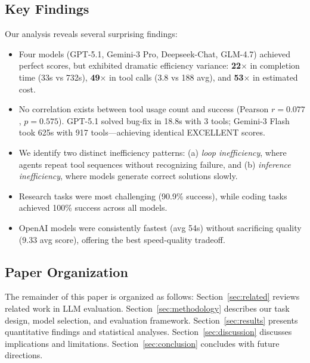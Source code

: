 \subsection{Key Findings}

Our analysis reveals several surprising findings:

\begin{itemize}
    \item Four models (GPT-5.1, Gemini-3 Pro, Deepseek-Chat, GLM-4.7) achieved perfect scores, but exhibited dramatic efficiency variance: \textbf{22$\times$} in completion time (33s vs 732s), \textbf{49$\times$} in tool calls (3.8 vs 188 avg), and \textbf{53$\times$} in estimated cost.

    \item No correlation exists between tool usage count and success (Pearson $r=0.077$, $p=0.575$). GPT-5.1 solved bug-fix in 18.8s with 3 tools; Gemini-3 Flash took 625s with 917 tools---achieving identical EXCELLENT scores.

    \item We identify two distinct inefficiency patterns: (a) \textit{loop inefficiency}, where agents repeat tool sequences without recognizing failure, and (b) \textit{inference inefficiency}, where models generate correct solutions slowly.

    \item Research tasks were most challenging (90.9\% success), while coding tasks achieved 100\% success across all models.

    \item OpenAI models were consistently fastest (avg 54s) without sacrificing quality (9.33 avg score), offering the best speed-quality tradeoff.
\end{itemize}

\subsection{Paper Organization}

The remainder of this paper is organized as follows:
Section~\ref{sec:related} reviews related work in LLM evaluation.
Section~\ref{sec:methodology} describes our task design, model selection, and evaluation framework.
Section~\ref{sec:results} presents quantitative findings and statistical analyses.
Section~\ref{sec:discussion} discusses implications and limitations.
Section~\ref{sec:conclusion} concludes with future directions.
